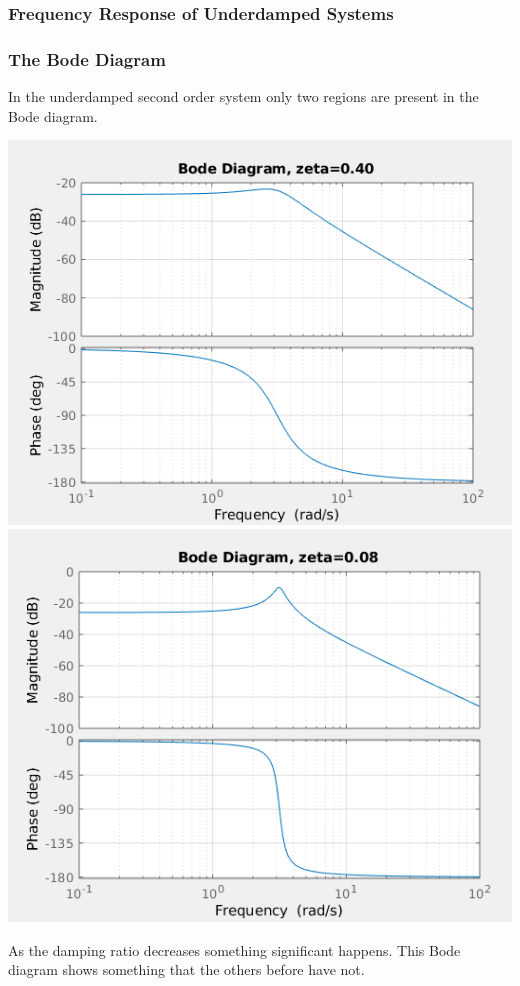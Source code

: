 \documentclass[fleqn]{beamer} %
\newcommand{\sectionIIIsubsectionIIItitle}{Frequency Response of Underdamped Systems}
\begin{document}
			\begin{frame}
				\frametitle{\sectionIIIsubsectionIIItitle}
				\bigskip

				\frametitle{The Bode Diagram}
				\small

				In the underdamped second order system only two regions are present in the Bode diagram. 

				\includegraphics[scale=.27]{images/lecture3_fig4.png}  \includegraphics[scale=.27]{images/lecture3_fig5.png} 

				As the damping ratio decreases something significant happens. This Bode diagram shows something that the others before have not.

				\btVFill
			\end{frame}
\end{document}
